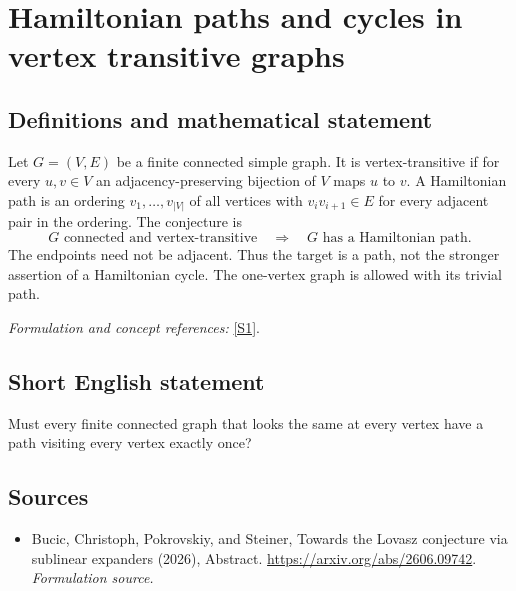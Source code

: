 \documentclass[11pt]{article}
\begin{document}
\section*{\texorpdfstring{Hamiltonian paths and cycles in vertex transitive graphs}{Hamiltonian paths and cycles in vertex transitive graphs}}\label{3144}
\subsection{Definitions and mathematical statement}
Let $G=(V,E)$ be a finite connected simple graph. It is vertex-transitive if for every $u,v\in V$ an adjacency-preserving bijection of $V$ maps $u$ to $v$. A Hamiltonian path is an ordering $v_1,\ldots,v_{|V|}$ of all vertices with $v_iv_{i+1}\in E$ for every adjacent pair in the ordering. The conjecture is
\[
 G\text{ connected and vertex-transitive}
 \quad\Longrightarrow\quad G\text{ has a Hamiltonian path}.
\]
The endpoints need not be adjacent. Thus the target is a path, not the stronger assertion of a Hamiltonian cycle. The one-vertex graph is allowed with its trivial path.
\par\smallskip\textit{Formulation and concept references:} \href{https://arxiv.org/abs/2606.09742}{[S1]}.

\subsection{Short English statement}
Must every finite connected graph that looks the same at every vertex have a path visiting every vertex exactly once?
\subsection{Sources}
\begin{itemize}
\item[S1]Bucic, Christoph, Pokrovskiy, and Steiner, Towards the Lovasz conjecture via sublinear expanders (2026), Abstract.
\url{https://arxiv.org/abs/2606.09742}.
\textit{Formulation source.}
\end{itemize}
\end{document}
